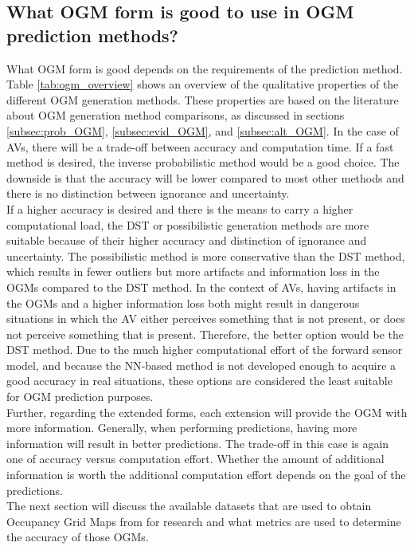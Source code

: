 \subsection{What \gls{OGM} form is good to use in \gls{OGM} prediction methods?} \label{subsec:OGM_conclude}
What \gls{OGM} form is good depends on the requirements of the prediction method. Table \ref{tab:ogm_overview} shows an overview of the qualitative properties of the different \gls{OGM} generation methods. These properties are based on the literature about \gls{OGM} generation method comparisons, as discussed in sections \ref{subsec:prob_OGM}, \ref{subsec:evid_OGM}, and \ref{subsec:alt_OGM}. In the case of \glspl{AV}, there will be a trade-off between accuracy and computation time. If a fast method is desired, the inverse probabilistic method would be a good choice. The downside is that the accuracy will be lower compared to most other methods and there is no distinction between ignorance and uncertainty. \\

If a higher accuracy is desired and there is the means to carry a higher computational load, the \gls{DST} or possibilistic generation methods are more suitable because of their higher accuracy and distinction of ignorance and uncertainty. The possibilistic method is more conservative than the \gls{DST} method, which results in fewer outliers but more artifacts and information loss in the \glspl{OGM} compared to the \gls{DST} method. In the context of \glspl{AV}, having artifacts in the \glspl{OGM} and a higher information loss both might result in dangerous situations in which the \gls{AV} either perceives something that is not present, or does not perceive something that is present. Therefore, the better option would be the \gls{DST} method. Due to the much higher computational effort of the forward sensor model, and because the \gls{NN}-based method is not developed enough to acquire a good accuracy in real situations, these options are considered the least suitable for \gls{OGM} prediction purposes. \\ 

Further, regarding the extended forms, each extension will provide the \gls{OGM} with more information. Generally, when performing predictions, having more information will result in better predictions. The trade-off in this case is again one of accuracy versus computation effort. Whether the amount of additional information is worth the additional computation effort depends on the goal of the predictions. \\

The next section will discuss the available datasets that are used to obtain Occupancy Grid Maps from for research and what metrics are used to determine the accuracy of those OGMs. 


